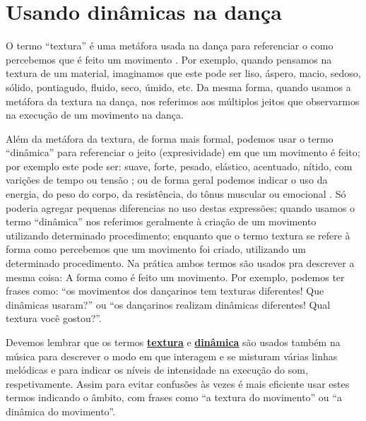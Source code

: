 \newpage
\section{Usando dinâmicas na dança}
\label{sec:musicalidade:dinamicas}

O termo ``textura'' é uma metáfora usada na dança para referenciar 
o como percebemos que é feito um movimento \cite[pp. 127,268,270]{preston1995dance}.
Por exemplo, quando pensamos na textura de um material,
imaginamos que este pode ser liso, áspero, macio, sedoso, sólido, pontiagudo, fluido, seco, úmido, etc. 
Da mesma forma, quando usamos a metáfora da textura na dança,
nos referimos aos múltiplos jeitos que observarmos na execução de um movimento na dança.

Além da metáfora da textura, de forma mais formal, podemos usar o termo ``dinâmica''  
para referenciar o jeito (expresividade) em que um movimento é feito;
por exemplo este pode ser: suave, forte, pesado, elástico, acentuado, nítido, com varições de tempo ou tensão \cite[pp. 268]{preston1995dance}
\cite[pp. 10]{cullingford2013children} \cite[pp. 424, 447]{guest2013labanotation};
ou de forma geral podemos indicar o uso da energia, do peso do corpo, da resistência, do tônus muscular ou emocional \cite[pp. 424]{cullingford2013children}.
Só poderia agregar pequenas diferencias no uso destas expressões;
quando usamos o termo ``dinâmica'' nos referimos geralmente à criação de um movimento  
utilizando determinado procedimento;
enquanto que o termo textura 
se refere à forma como percebemos que um movimento foi criado, utilizando  um determinado procedimento.
Na prática ambos termos são usados pra descrever a mesma coisa: A forma como é feito um movimento.
Por exemplo, podemos ter frases como: ``os movimentos dos dançarinos tem texturas diferentes! Que dinâmicas usaram?''
ou ``os dançarinos realizam dinâmicas diferentes! Qual textura você gostou?''.

\begin{tcbattention}
Devemos lembrar que os termos \hyperref[sec:texturasmusica]{\textbf{textura}} e \hyperref[sec:sinaisintensidade]{\textbf{dinâmica}} 
são usados também na música 
para descrever o modo em que interagem e se misturam várias linhas melódicas e
para indicar os níveis de intensidade na execução do som, respetivamente. 
Assim para evitar confusões às vezes é mais eficiente usar estes termos indicando o âmbito, 
com frases como ``a textura do movimento'' ou ``a dinâmica do movimento''.
\end{tcbattention}


